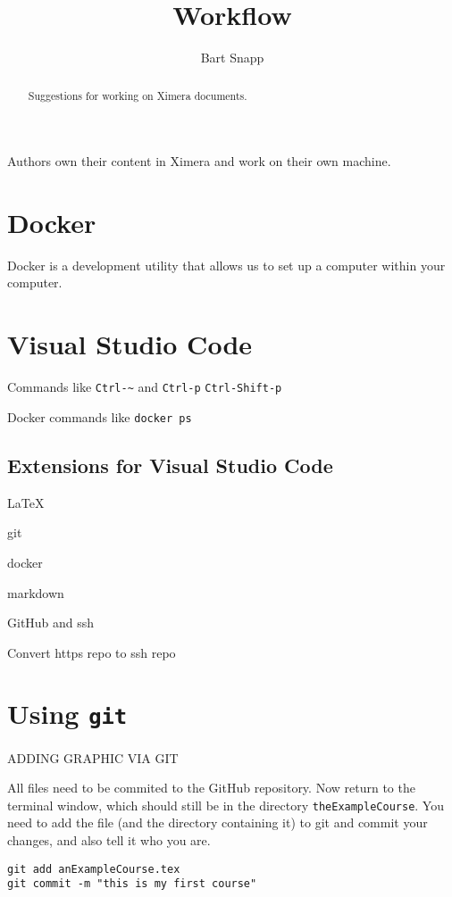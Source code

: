 \documentclass{ximera}
\title{Workflow}
\author{Bart Snapp}
\begin{document}
\begin{abstract}
    Suggestions for working on Ximera documents.
\end{abstract}
\maketitle

Authors own their content in Ximera and work on their own machine.



\section{Docker}

Docker is a development utility that allows us to set up a computer within your computer. 


\section{Visual Studio Code}
Commands like \verb!Ctrl-~! and \verb!Ctrl-p! \verb!Ctrl-Shift-p!

Docker commands like
\verb!docker ps!

\subsection{Extensions for Visual Studio Code}

\LaTeX

git

docker

markdown



GitHub and ssh

Convert https repo to ssh repo






\section{Using \texttt{git}}

ADDING GRAPHIC VIA GIT


All files need to be commited to the GitHub repository.
Now return to the terminal window, which should still be in the
directory
\verb!theExampleCourse!. You need to add the file (and the directory
containing
it) to git and commit your changes, and also tell it who you are.
\begin{verbatim}
git add anExampleCourse.tex
git commit -m "this is my first course"
\end{verbatim}
\end{document}
